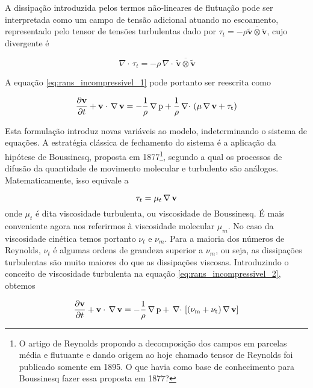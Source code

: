 \documentclass[a4paper,portuguese,10pt]{article}
\renewcommand{\div}{{\,\nabla\cdot}\,}
\newcommand{\grad}{\,\rm \nabla\,}
\renewcommand{\D}{\partial}
\renewcommand{\vec}{\mathbf}
\begin{document}
A dissipação introduzida pelos termos não-lineares de flutuação pode ser interpretada como um campo de tensão adicional atuando no escoamento, representado pelo tensor de tensões turbulentas dado por $\tau_t=-\rho\overline{\tilde{\vec{v}}\otimes\tilde{\vec{v}}}$, cujo divergente é

\begin{equation}
  \div\tau_t = -\rho\div\overline{\tilde{\vec{v}}\otimes\tilde{\vec{v}}}
\end{equation}

A equação \ref{eq:rans_incompressivel_1} pode portanto ser reescrita como

\begin{equation}
  \frac{\D\vec{v}}{\D t}+\vec{v}\cdot\grad\vec{v}=-\frac{1}{\rho}\grad p+\frac{1}{\rho}\div\left(\mu\grad\vec{v}+\tau_t\right)
  \label{eq:rans_incompressivel_2}
\end{equation}

Esta formulação introduz novas variáveis ao modelo, indeterminando o sistema de equações. A estratégia clássica de fechamento do sistema é a aplicação da hipótese de Boussinesq, proposta em 1877\cite{FREIRE02}\footnote{O artigo de Reynolds propondo a decomposição dos campos em parcelas média e flutuante e dando origem ao hoje chamado tensor de Reynolds foi publicado somente em 1895. O que havia como base de conhecimento para Boussinesq fazer essa proposta em 1877?}, segundo a qual os processos de difusão da quantidade de movimento molecular e turbulento são análogos. Matematicamente, isso equivale a

\begin{equation}
  \tau_t = \mu_t\grad\vec{v}
\end{equation}
onde $\mu_t$ é dita viscosidade turbulenta, ou viscosidade de Boussinesq. É mais conveniente agora nos referirmos à viscosidade molecular $\mu_m$. No caso da viscosidade cinética temos portanto $\nu_t$ e $\nu_m$. Para a maioria dos números de Reynolds, $\nu_t$ é algumas ordens de grandeza superior a $\nu_m$, ou seja, as dissipações turbulentas são muito maiores do que as dissipações viscosas. Introduzindo o conceito de viscosidade turbulenta na equação \ref{eq:rans_incompressivel_2}, obtemos

\begin{equation}
  \frac{\D\vec{v}}{\D t}+\vec{v}\cdot\grad\vec{v}=-\frac{1}{\rho}\grad p+\div\left[(\nu_m+\nu_t)\grad\vec{v}\right]
  \label{eq:rans_incompressivel_boussinesq1}
\end{equation}
\end{document}
